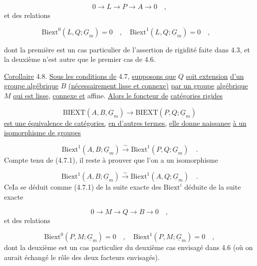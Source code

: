 \begin{equation*}
0 \longrightarrow L \longrightarrow P \longrightarrow A \longrightarrow 0 \quad ,
\end{equation*}
et des relations

\begin{equation*}
\mathrm{Biext}^0(L,Q;\underline{G}_m) = 0 \quad , \quad \mathrm{Biext}^1(L,Q;\underline{G}_m) = 0 \quad , \quad 
\end{equation*}


 dont la première est un cas particulier de l'assertion de rigidité faite dans 4.3, et la deuxième n'est autre que le premier cas de 4.6.

\underline{Corollaire} 4.8. \underline{Sous les conditions de} 4.7, \underline{supposons que} $Q$ \underline{soit extension} \underline{d'un groupe algébrique} $B$ \underline{(nécessairement lisse et connexe)} \underline{par un groupe} \underline{algébrique} $M$ \underline{qui est lisse}, \underline{connexe et} affine. \underline{Alors le foncteur de} \underline{catégories rigides}

\begin{equation*}
\mathrm{BIEXT}(A,B,\underline{G}_m) \longrightarrow \mathrm{BIEXT}(P,Q;\underline{G}_m)
\end{equation*}
\underline{est une équivalence de catégories,} \underline{en d'autres termes,} \underline{elle donne naissanee} \underline{à un isomorphisme de groupes}

\begin{equation}\tag{4.8.1}
\mathrm{Biext}^1(A,B;\underline{G}_m) \stackrel{\sim}{\longrightarrow} \mathrm{Biext}^1(P,Q;\underline{G}_m) \quad .
\end{equation}
Compte tenu de (4.7.1), il reste à prouver que l'on a un isomorphisme

\begin{equation*}
\mathrm{Biext}^1(A,B;\underline{G}_m) \stackrel{\sim}{\longrightarrow} \mathrm{Biext}^1(A,Q;\underline{G}_m) \quad .
\end{equation*}
CeIa se déduit comme (4.7.1) de la suite exacte des $\mathrm{Biext}^i$ déduite de la suite exacte

\begin{equation*}
0 \longrightarrow M \longrightarrow Q \longrightarrow B \longrightarrow 0 \quad ,
\end{equation*}
et des relations

\begin{equation*}
\mathrm{Biext}^0(P,M;\underline{G}_m) = 0 \quad , \quad \mathrm{Biext}^1(P,M;\underline{G}_m) = 0 \quad ,
\end{equation*}
dont la deuxième est un cas particulier du deuxième cas envisagé dans 4.6 (où on aurait échangé le rôle des deux facteurs envisagés).



